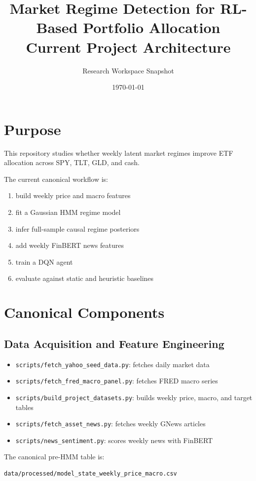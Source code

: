 \documentclass[11pt,a4paper]{article}
\title{Market Regime Detection for RL-Based Portfolio Allocation\\[0.4em]
\large Current Project Architecture}
\author{Research Workspace Snapshot}
\date{\today}
\begin{document}
\maketitle
\tableofcontents
\newpage

\section{Purpose}

This repository studies whether weekly latent market regimes improve ETF
allocation across SPY, TLT, GLD, and cash.

The current canonical workflow is:
\begin{enumerate}[nosep]
    \item build weekly price and macro features
    \item fit a Gaussian HMM regime model
    \item infer full-sample causal regime posteriors
    \item add weekly FinBERT news features
    \item train a DQN agent
    \item evaluate against static and heuristic baselines
\end{enumerate}

\section{Canonical Components}

\subsection{Data Acquisition and Feature Engineering}

\begin{itemize}[nosep]
    \item \texttt{scripts/fetch\_yahoo\_seed\_data.py}: fetches daily market data
    \item \texttt{scripts/fetch\_fred\_macro\_panel.py}: fetches FRED macro series
    \item \texttt{scripts/build\_project\_datasets.py}: builds weekly price, macro, and target tables
    \item \texttt{scripts/fetch\_asset\_news.py}: fetches weekly GNews articles
    \item \texttt{scripts/news\_sentiment.py}: scores weekly news with FinBERT
\end{itemize}

The canonical pre-HMM table is:
\begin{verbatim}
data/processed/model_state_weekly_price_macro.csv
\end{verbatim}
\end{document}

